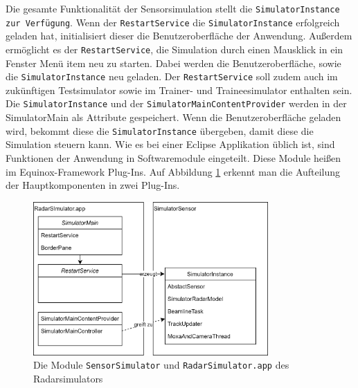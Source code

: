 Die gesamte Funktionalität der Sensorsimulation stellt die \texttt{SimulatorInstance zur Verfügung}. Wenn der \texttt{RestartService} die \texttt{SimulatorInstance} erfolgreich geladen hat, initialisiert dieser die Benutzeroberfläche der Anwendung. Außerdem ermöglicht es der \texttt{RestartService}, die Simulation durch einen Mausklick in ein Fenster Menü item neu zu starten. Dabei werden die Benutzeroberfläche, sowie die \texttt{SimulatorInstance} neu geladen. Der \texttt{RestartService} soll zudem auch im zukünftigen Testsimulator sowie im Trainer- und Traineesimulator enthalten sein. Die \texttt{SimulatorInstance} und der \texttt{SimulatorMainContentProvider} werden in der SimulatorMain als Attribute gespeichert. Wenn die Benutzeroberfläche geladen wird, bekommt diese die \texttt{SimulatorInstance} übergeben, damit diese die Simulation steuern kann. Wie es bei einer Eclipse Applikation üblich ist, sind Funktionen der Anwendung in Softwaremodule eingeteilt. Diese Module heißen im Equinox-Framework Plug-Ins. Auf Abbildung \ref{img:SimulatorModels} erkennt man die Aufteilung der Hauptkomponenten in zwei Plug-Ins.

\begin{figure}[h]
    \centering
    \includegraphics[width=0.8\textwidth]{content/assets/Kapitel3/SimulatorModels.png}
    \caption{Die Module \texttt{SensorSimulator} und \texttt{RadarSimulator.app} des Radarsimulators}
    \label{img:SimulatorModels}
\end{figure}



